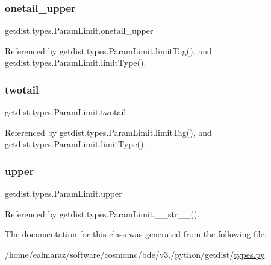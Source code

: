 \subsubsection{\texorpdfstring{onetail\+\_\+upper}{onetail\_upper}}
{\footnotesize\ttfamily getdist.\+types.\+Param\+Limit.\+onetail\+\_\+upper}



Referenced by getdist.\+types.\+Param\+Limit.\+limit\+Tag(), and getdist.\+types.\+Param\+Limit.\+limit\+Type().

\mbox{\label{classgetdist_1_1types_1_1ParamLimit_ae19826f1e120be1bb4fd06c0d16da78b}} 
\subsubsection{\texorpdfstring{twotail}{twotail}}
{\footnotesize\ttfamily getdist.\+types.\+Param\+Limit.\+twotail}



Referenced by getdist.\+types.\+Param\+Limit.\+limit\+Tag(), and getdist.\+types.\+Param\+Limit.\+limit\+Type().

\mbox{\label{classgetdist_1_1types_1_1ParamLimit_a5b627d1abf77bd48d7405b361867f660}} 
\subsubsection{\texorpdfstring{upper}{upper}}
{\footnotesize\ttfamily getdist.\+types.\+Param\+Limit.\+upper}



Referenced by getdist.\+types.\+Param\+Limit.\+\_\+\+\_\+str\+\_\+\+\_\+().



The documentation for this class was generated from the following file\+:\begin{DoxyCompactItemize}
\item 
/home/ealmaraz/software/cosmomc/bde/v3./python/getdist/\mbox{\hyperlink{types_8py}{types.\+py}}\end{DoxyCompactItemize}
